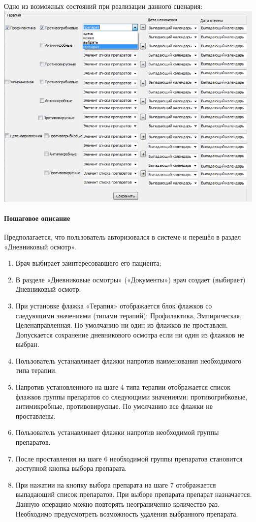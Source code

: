 \documentclass[a4paper,8pt]{report} %
\begin{document}
{        Одно из возможных состояний при реализации данного сценария:
        \includegraphics[width=\textwidth]{state_example_3}

    \paragraph*{Пошаговое описание}
        Предполагается, что пользователь авторизовался в системе и перешёл в раздел
        «Дневниковый осмотр».

        \begin{enumerate}
              \item Врач выбирает заинтересовавшего его пациента;
              \item В разделе «Дневниковые осмотры» («Документы») врач создает (выбирает)
              Дневниковый осмотр;
              \item При установке флажка «Терапия» отображается блок флажков со следующими
              значениями (типами терапий): Профилактика, Эмпирическая, Целенаправленная. По
              умолчанию ни один из флажков не проставлен. Допускается сохранение дневникового
              осмотра если ни один из флажков не выбран.
              \item Пользователь устанавливает флажки напротив наименования необходимого типа
              терапии.
              \item Напротив установленного на шаге 4 типа терапии отображается список флажков
              группы препаратов со следующими значениями: противогрибковые, антимикробные,
              противовирусные. По умолчанию все флажки не проставлены.
              \item Пользователь устанавливает флажки напротив необходимой группы препаратов.
              \item После проставления на шаге 6 необходимой группы препаратов становится доступной
              кнопка выбора препарата.
              \item При нажатии на кнопку выбора препарата на шаге 7 отображается выпадающий список
              препаратов. При выборе препарата препарат назначается. Данную операцию можно
              повторять неограниченно количество раз. Необходимо предусмотреть возможность
              удаления выбранного препарата.


\end{enumerate}}
\end{document}
